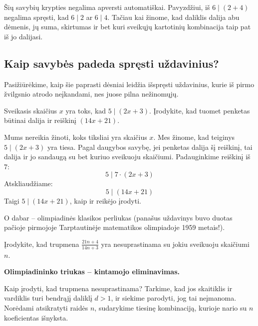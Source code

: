 \documentclass[11pt,a4paper]{scrartcl}
\begin{document}
\begin{remark*}
Šių savybių krypties negalima apversti automatiškai. Pavyzdžiui, iš \(6\mid(2+4)\) negalima spręsti, kad \(6\mid2\) ar \(6\mid4\). Tačiau kai žinome, kad daliklis dalija abu dėmenis, jų suma, skirtumas ir bet kuri sveikųjų kartotinių kombinacija taip pat iš jo dalijasi.
\end{remark*}

\subsection{Kaip savybės padeda spręsti uždavinius?}

Pasižiūrėkime, kaip šie paprasti dėsniai leidžia išspręsti uždavinius, kurie iš pirmo žvilgsnio atrodo neįkandami, nes juose pilna nežinomųjų.

\begin{example}
Sveikasis skaičius \(x\) yra toks, kad \(5 \mid (2x + 3)\). Įrodykite, kad tuomet penketas būtinai dalija ir reiškinį \((14x + 21)\).
\end{example}

\begin{solution}
Mums nereikia žinoti, koks tiksliai yra skaičius \(x\). 
Mes žinome, kad teiginys \(5 \mid (2x + 3)\) yra tiesa.
Pagal daugybos savybę, jei penketas dalija šį reiškinį, tai dalija ir jo sandaugą su bet kuriuo sveikuoju skaičiumi. Padauginkime reiškinį iš $7$:
\begin{equation*} 
5 \mid 7 \cdot (2x + 3) 
\end{equation*}
Atskliaudžiame:
\begin{equation*} 
5 \mid (14x + 21) 
\end{equation*}
Taigi \(5\mid(14x+21)\), kaip ir reikėjo įrodyti.
\end{solution}

O dabar – olimpiadinės klasikos perliukas (panašus uždavinys buvo duotas pačioje pirmojoje Tarptautinėje matematikos olimpiadoje 1959 metais!).

\begin{example}
Įrodykite, kad trupmena \(\frac{21n + 4}{14n + 3}\) yra nesuprastinama su jokiu sveikuoju skaičiumi \(n\).
\end{example}

\begin{remark*}
\textbf{Olimpiadininko triukas – kintamojo eliminavimas.}

Kaip įrodyti, kad trupmena nesuprastinama? Tarkime, kad jos skaitiklis ir vardiklis turi bendrąjį daliklį \(d>1\), ir siekime parodyti, jog tai neįmanoma. Norėdami atsikratyti raidės \(n\), sudarykime tiesinę kombinaciją, kurioje nario su \(n\) koeficientas išnyksta.
\end{remark*}
\end{document}
